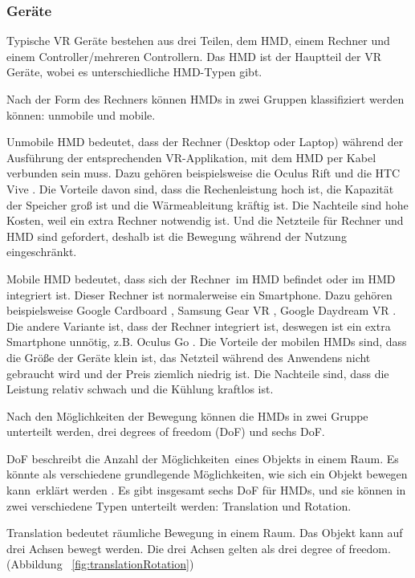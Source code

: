   \subsubsection{Geräte}
  Typische VR Geräte bestehen aus drei Teilen, dem HMD, einem Rechner und einem Controller/mehreren Controllern. Das HMD ist der Hauptteil der VR Geräte, wobei es unterschiedliche HMD-Typen gibt.
  
  Nach der Form des Rechners können HMDs in zwei Gruppen klassifiziert werden können: unmobile und mobile.
  
  Unmobile HMD bedeutet, dass der Rechner (Desktop oder Laptop) während der Ausführung der entsprechenden VR-Applikation, mit dem HMD per Kabel verbunden sein muss. Dazu gehören beispielsweise die Oculus Rift \citep{31} und die HTC Vive \citep{32}. Die Vorteile davon sind, dass die Rechenleistung hoch ist, die Kapazität der Speicher groß ist und die Wärmeableitung kräftig ist. Die Nachteile sind hohe Kosten, weil ein extra Rechner notwendig ist. Und die Netzteile für Rechner und HMD sind gefordert, deshalb ist die Bewegung während der Nutzung eingeschränkt.
  
  Mobile HMD bedeutet, dass sich der \glqq Rechner\grqq\ im HMD befindet oder im HMD integriert ist. Dieser Rechner ist normalerweise ein Smartphone. Dazu gehören beispielsweise Google Cardboard \citep{33}, Samsung Gear VR \citep{34}, Google Daydream VR \citep{35}. Die andere Variante ist, dass der Rechner integriert ist, deswegen ist ein extra Smartphone unnötig, z.B. Oculus Go \citep{36}. Die Vorteile der mobilen HMDs sind, dass die Größe der Geräte klein ist, das Netzteil während des Anwendens nicht gebraucht wird und der Preis ziemlich niedrig ist. Die Nachteile sind, dass die Leistung relativ schwach und die Kühlung kraftlos ist.
  
  Nach den Möglichkeiten der Bewegung können die HMDs in zwei Gruppe unterteilt werden, drei degrees of freedom (DoF) und sechs DoF.
  
  DoF beschreibt die \glqq Anzahl der Möglichkeiten\grqq\ eines Objekts in einem Raum. Es könnte als \glqq verschiedene grundlegende Möglichkeiten, wie sich ein Objekt bewegen kann\grqq\ erklärt werden \citep{25}. Es gibt insgesamt sechs DoF für HMDs, und sie können in zwei verschiedene Typen unterteilt werden: Translation und Rotation.
  
  Translation bedeutet räumliche Bewegung in einem Raum. Das Objekt kann auf drei Achsen bewegt werden. Die drei Achsen gelten als drei \glqq degree of freedom\grqq. (Abbildung ~\ref{fig:translationRotation})
  
